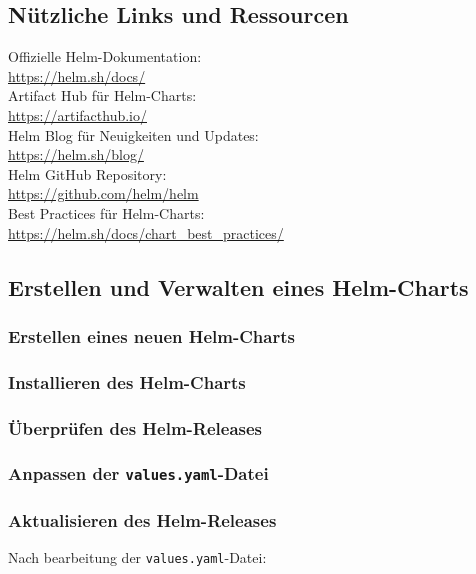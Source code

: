 \subsection*{Nützliche Links und Ressourcen}
Offizielle Helm-Dokumentation:\\
\url{https://helm.sh/docs/}\\
Artifact Hub für Helm-Charts:\\
\url{https://artifacthub.io/}\\
Helm Blog für Neuigkeiten und Updates:\\
\url{https://helm.sh/blog/}\\
Helm GitHub Repository:\\
\url{https://github.com/helm/helm}\\
Best Practices für Helm-Charts:\\
\url{https://helm.sh/docs/chart_best_practices/}

\newpage
\subsection{Erstellen und Verwalten eines Helm-Charts}

\subsubsection{Erstellen eines neuen Helm-Charts}


\subsubsection{Installieren des Helm-Charts}


\subsubsection{Überprüfen des Helm-Releases}


\subsubsection{Anpassen der \texttt{values.yaml}-Datei}



\subsubsection{Aktualisieren des Helm-Releases}
Nach bearbeitung der \texttt{values.yaml}-Datei:


